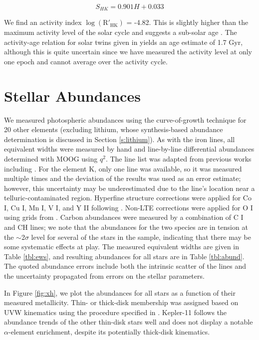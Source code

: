 \documentclass[oneside]{emulateapj}
\begin{document}
\begin{equation}
S_{HK} = 0.901 H + 0.033
\end{equation}

We find an activity index $\log(\mathrm{R'_{HK}})$ = -4.82. This is slightly higher than the maximum activity level of the solar cycle and suggests a sub-solar age \citep{Skumanich1972}. The activity-age relation for solar twins given in \citet{Freitas2016} yields an age estimate of 1.7 Gyr, although this is quite uncertain since we have measured the activity level at only one epoch and cannot average over the activity cycle.


\section{Stellar Abundances}
\label{s:abundances}

We measured photospheric abundances using the curve-of-growth technique for 20 other elements (excluding lithium, whose synthesis-based abundance determination is discussed in Section \ref{s:lithium}). As with the iron lines, all equivalent widths were measured by hand and line-by-line differential abundances determined with MOOG using $q^2$. The line list was adapted from previous works including \citet{Bedell2014}. For the element K, only one line was available, so it was measured multiple times and the deviation of the results was used as an error estimate; however, this uncertainty may be underestimated due to the line's location near a telluric-contaminated region. Hyperfine structure corrections were applied for Co I, Cu I, Mn I, V I, and Y II following \citet{Melendez2012}. Non-LTE corrections were applied for O I  using grids from \citet{Ramirez2007} . Carbon abundances were measured by a combination of C I and CH lines; we note that the abundances for the two species are in tension at the $\sim$2$\sigma$ level for several of the stars in the sample, indicating that there may be some systematic effects at play. The measured equivalent widths are given in Table \ref{tbl:ews}, and resulting abundances for all stars are in Table \ref{tbl:abund}.  The quoted abundance errors include both the intrinsic scatter of the lines and the uncertainty propagated from errors on the stellar parameters.

In Figure \ref{fig:xh}, we plot the abundances for all stars as a function of their measured metallicity. Thin- or thick-disk membership was assigned based on UVW kinematics using the procedure specified in \citet{Reddy2006}. Kepler-11 follows the abundance trends of the other thin-disk stars well and does not display a notable $\alpha$-element enrichment, despite its potentially thick-disk kinematics.
\end{document}
